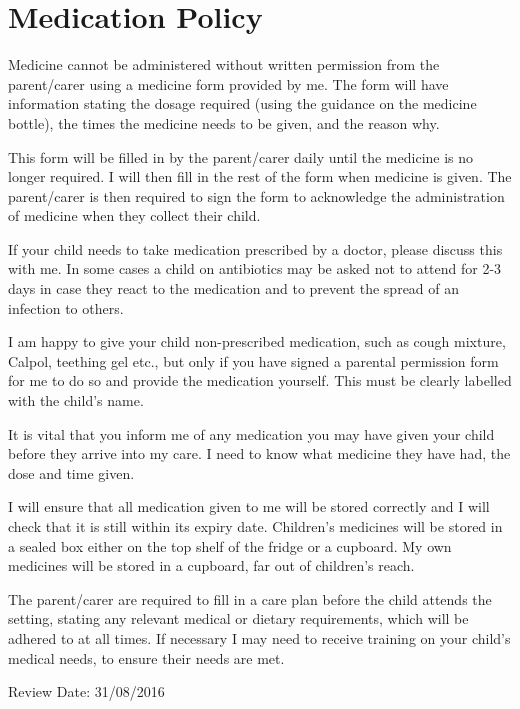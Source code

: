 

\section{Medication Policy}

Medicine cannot be administered without written permission from the
parent/carer using a medicine form provided by me. The form will have
information stating the dosage required (using the guidance on the
medicine bottle), the times the medicine needs to be given, and the
reason why.

This form will be filled in by the parent/carer daily until the medicine
is no longer required. I will then fill in the rest of the form when
medicine is given. The parent/carer is then required to sign the form to
acknowledge the administration of medicine when they collect their
child.

If your child needs to take medication prescribed by a doctor, please
discuss this with me. In some cases a child on antibiotics may be asked
not to attend for 2-3 days in case they react to the medication and to
prevent the spread of an infection to others.

I am happy to give your child non-prescribed medication, such as cough
mixture, Calpol, teething gel etc., but only if you have signed a
parental permission form for me to do so and provide the medication
yourself. This must be clearly labelled with the child's name.

It is vital that you inform me of any medication you may have given your
child before they arrive into my care. I need to know what medicine they
have had, the dose and time given.

I will ensure that all medication given to me will be stored correctly
and I will check that it is still within its expiry date. Children's
medicines will be stored in a sealed box either on the top shelf of the
fridge or a cupboard. My own medicines will be stored in a cupboard, far
out of children's reach.

The parent/carer are required to fill in a care plan before the child
attends the setting, stating any relevant medical or dietary
requirements, which will be adhered to at all times. If necessary I may
need to receive training on your child's medical needs, to ensure their
needs are met.

Review Date: 31/08/2016


